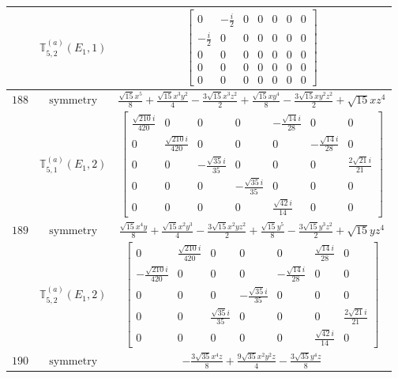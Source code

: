 \documentclass[fleqn,8pt,landscape]{jsarticle}
\begin{document}
\begin{longtable}{ccc}
$  $ & $ \mathbb{T}_{5,2}^{(a)}(E_{1},1) $ & $ \begin{bmatrix} 0 & - \frac{i}{2} & 0 & 0 & 0 & 0 & 0 \\ - \frac{i}{2} & 0 & 0 & 0 & 0 & 0 & 0 \\ 0 & 0 & 0 & 0 & 0 & 0 & 0 \\ 0 & 0 & 0 & 0 & 0 & 0 & 0 \\ 0 & 0 & 0 & 0 & 0 & 0 & 0 \end{bmatrix} $ \\ \hline
$ 188 $ & $ \text{symmetry} $ & $ \frac{\sqrt{15} x^{5}}{8} + \frac{\sqrt{15} x^{3} y^{2}}{4} - \frac{3 \sqrt{15} x^{3} z^{2}}{2} + \frac{\sqrt{15} x y^{4}}{8} - \frac{3 \sqrt{15} x y^{2} z^{2}}{2} + \sqrt{15} x z^{4} $ \\
$  $ & $ \mathbb{T}_{5,1}^{(a)}(E_{1},2) $ & $ \begin{bmatrix} \frac{\sqrt{210} i}{420} & 0 & 0 & 0 & - \frac{\sqrt{14} i}{28} & 0 & 0 \\ 0 & \frac{\sqrt{210} i}{420} & 0 & 0 & 0 & - \frac{\sqrt{14} i}{28} & 0 \\ 0 & 0 & - \frac{\sqrt{35} i}{35} & 0 & 0 & 0 & \frac{2 \sqrt{21} i}{21} \\ 0 & 0 & 0 & - \frac{\sqrt{35} i}{35} & 0 & 0 & 0 \\ 0 & 0 & 0 & 0 & \frac{\sqrt{42} i}{14} & 0 & 0 \end{bmatrix} $ \\ \hline
$ 189 $ & $ \text{symmetry} $ & $ \frac{\sqrt{15} x^{4} y}{8} + \frac{\sqrt{15} x^{2} y^{3}}{4} - \frac{3 \sqrt{15} x^{2} y z^{2}}{2} + \frac{\sqrt{15} y^{5}}{8} - \frac{3 \sqrt{15} y^{3} z^{2}}{2} + \sqrt{15} y z^{4} $ \\
$  $ & $ \mathbb{T}_{5,2}^{(a)}(E_{1},2) $ & $ \begin{bmatrix} 0 & \frac{\sqrt{210} i}{420} & 0 & 0 & 0 & \frac{\sqrt{14} i}{28} & 0 \\ - \frac{\sqrt{210} i}{420} & 0 & 0 & 0 & - \frac{\sqrt{14} i}{28} & 0 & 0 \\ 0 & 0 & 0 & - \frac{\sqrt{35} i}{35} & 0 & 0 & 0 \\ 0 & 0 & \frac{\sqrt{35} i}{35} & 0 & 0 & 0 & \frac{2 \sqrt{21} i}{21} \\ 0 & 0 & 0 & 0 & 0 & \frac{\sqrt{42} i}{14} & 0 \end{bmatrix} $ \\ \hline
$ 190 $ & $ \text{symmetry} $ & $ - \frac{3 \sqrt{35} x^{4} z}{8} + \frac{9 \sqrt{35} x^{2} y^{2} z}{4} - \frac{3 \sqrt{35} y^{4} z}{8} $ \\

\end{longtable}
\end{document}
